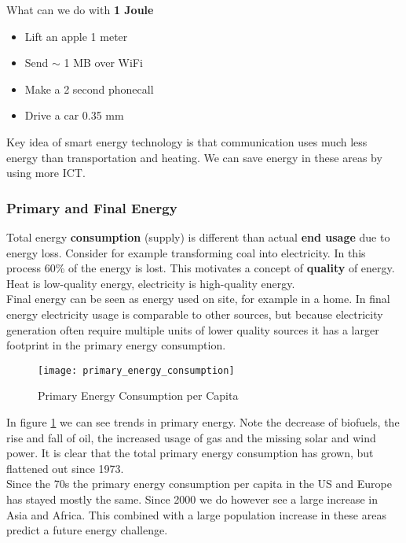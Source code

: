What can we do with \textbf{1 Joule}
\begin{itemize}
    \item Lift an apple 1 meter
    \item Send $\sim$ 1 MB over WiFi
    \item Make a 2 second phonecall
    \item Drive a car 0.35 mm
\end{itemize}

Key idea of smart energy technology is that communication uses much less energy than transportation and heating.
We can save energy in these areas by using more ICT.

\subsubsection{Primary and Final Energy}
Total energy \textbf{consumption} (supply) is different than actual \textbf{end usage} due to energy loss.
Consider for example transforming coal into electricity.
In this process 60\% of the energy is lost.
This motivates a concept of \textbf{quality} of energy.
Heat is low-quality energy, electricity is high-quality energy.\\

Final energy can be seen as energy used on site, for example in a home.
In final energy electricity usage is comparable to other sources, but because electricity generation often require multiple units of lower quality sources it has a larger footprint in the primary energy consumption.\\

\begin{figure}
    \centering
    \texttt{[image: primary\_energy\_consumption]}
    \caption{Primary Energy Consumption per Capita}
    \label{fig:primary_energy}
\end{figure}

In figure \ref{fig:primary_energy} we can see trends in primary energy.
Note the decrease of biofuels, the rise and fall of oil, the increased usage of gas and the missing solar and wind power. It is clear that the total primary energy consumption has grown, but flattened out since 1973.\\

Since the 70s the primary energy consumption per capita in the US and Europe has stayed mostly the same.
Since 2000 we do however see a large increase in Asia and Africa.
This combined with a large population increase in these areas predict a future energy challenge.\\

